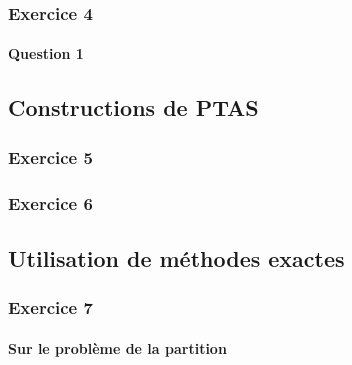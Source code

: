 \documentclass[a4paper, 12pt]{article}
\begin{document}
\subsubsection*{Exercice 4}

\paragraph{Question 1}

\subsection{Constructions de PTAS}

\subsubsection*{Exercice 5}

\subsubsection*{Exercice 6}

\subsection{Utilisation de méthodes exactes}

\subsubsection*{Exercice 7}

\paragraph{Sur le problème de la partition}
\end{document}
